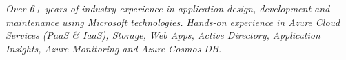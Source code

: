 %
%
%

\par{
    \begin{center}
    \emph{Over 6+ years of industry experience in application design, development and maintenance using Microsoft technologies.}
    \emph{Hands-on experience in Azure Cloud Services (PaaS & IaaS), Storage, Web Apps, Active Directory, Application Insights, Azure Monitoring and Azure Cosmos DB.}
    \end{center}
}